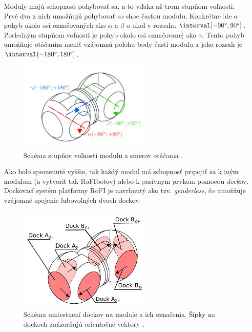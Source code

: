 \documentclass[
  digital, %
  oneside, %
  table,   %
  lof,     %
  nolot,     %
]{fithesis3}
\begin{document}
Moduly majú schopnosť pohybovať sa, a to vďaka až trom stupňom voľnosti. Prvé dva z nich umožňujú pohybovať so shoe časťou modulu. Konkrétne ide o pohyb okolo osí označovaných ako $\alpha$ a $\beta$  o uhol v rozsahu $\interval[{-90\degree, 90\degree}]$. Posledným stupňom voľnosti je pohyb okolo osi označovanej ako $\gamma$. Tento pohyb umožňuje otáčaním meniť vzájomnú polohu body častí modulu a jeho rozsah je $\interval({-180\degree, 180\degree}]$. 

\begin{figure}[hbt!]
    \centering
    \includegraphics[width=0.6\textwidth]{pictures/module_angles.pdf}
    \caption[Stupne voľnosti modulu]{Schéma stupňov voľnosti modulu a smerov otáčania \cite{mrazekMasterThesis}.}
    \label{fig:module_angle}
\end{figure}

Ako bolo spomenuté vyššie, tak každý modul má schopnosť pripojiť sa k iným modulom (a vytvoriť tak RoFIbotov) alebo k pasívnym prvkom pomocou \textit{dock}ov. Dockovací systém platformy RoFI je navrhnutý ako tzv. \textit{genderless}, čo umožňuje vzájomné spojenie ľubovoľných dvoch dockov. 

\begin{figure}[hbt!]
    \centering
    \includegraphics[width=0.6\textwidth]{pictures/dock_desc.pdf}
    \caption[Docky modulu]{Schéma umiestnení dockov na module a ich označenia. Šípky na dockoch znázorňujú orientačné vektory \cite{mrazekMasterThesis}.}
    \label{fig:dock_desc}
\end{figure}
\end{document}
